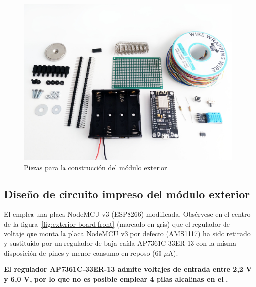 \begin{figure}
  \centering
  \includegraphics[width=0.98\columnwidth]{../photos/exterior-pieces}
  \caption{Piezas para la construcción del módulo exterior}
  \label{fig:exterior-pieces}
\end{figure}

\clearpage

\subsection{Diseño de circuito impreso del módulo exterior}

El \MEE emplea una placa NodeMCU v3 (ESP8266) modificada. Obsérvese en el centro de la figura~\ref{fig:exterior-board-front} (marcado en gris) que el regulador de voltaje que monta la placa NodeMCU v3 por defecto (AMS1117) ha sido retirado y sustituido por un regulador de baja caída AP7361C-33ER-13 con la misma disposición de pines y menor consumo en reposo (60 $\mu$A).

\textbf{El regulador AP7361C-33ER-13 admite voltajes de entrada entre 2,2 V y 6,0 V, por lo que no es posible emplear 4 pilas alcalinas en el \MEE.}
\importantend


